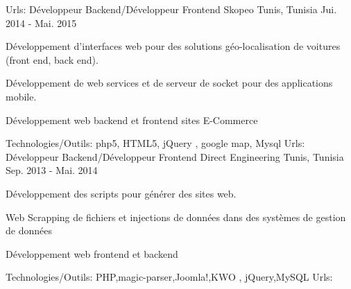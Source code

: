 \begin{cventries}
    {Urls:} 
    {\href{http://www.ozeol.com/en/}{} \break
    \href{http://www.milddream.com/fr/ }{} \break
    }    
  \techentries
    {Développeur Backend/Développeur Frontend}
    {Skopeo}
    {Tunis, Tunisia}
    {Jui. 2014 - Mai. 2015}
    {
      \begin{cvitems}
        \item {Développement d'interfaces web pour des solutions géo-localisation de voitures (front end, back end).}
        \item {Développement de web services et de serveur de socket pour des applications mobile.}
        \item {Développement web backend et frontend sites E-Commerce}
      \end{cvitems}
    }
    {\textcolor{awesome}{Technologies/Outils: } {\color{graytext}}  {php5, HTML5, jQuery , google map, Mysql}}
    {Urls:} 
    {\href{http://www.taxitasso.com/}{} \break
    \href{http://carafrika.net/}{} \break
    \href{http://darafrika.com/}{} \break    
    }       
  \techentries
    {Développeur Backend/Développeur Frontend}
    {Direct Engineering}
    {Tunis, Tunisia}
    {Sep. 2013 - Mai. 2014}
    {
      \begin{cvitems}
        \item {Développement des scripts pour générer des sites web.}
        \item {Web Scrapping de fichiers et injections de données dans des systèmes de gestion de données}
        \item {Développement web frontend et backend}
      \end{cvitems}
    }
    {\textcolor{awesome}{Technologies/Outils: } {\color{graytext}}  {PHP,magic-parser,Joomla!,KWO , jQuery,MySQL}}
    {Urls:} 
    {\href{http://www.pure-jobs.com/}{} \break
    \href{http://www.jeveux1truc.fr/fr/}{} \break
    }       
\end{cventries}
